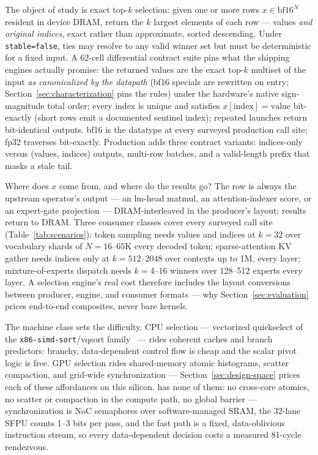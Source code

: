 The object of study is exact top-$k$ selection: given one or more rows
$x \in \mathrm{bf16}^{N}$ resident in device DRAM, return the $k$ largest
elements of each row --- values \emph{and original indices}, exact rather
than approximate, sorted descending. Under \texttt{stable=false}, ties may
resolve to any valid winner set but must be deterministic for a fixed
input. A 62-cell differential contract suite pins what the shipping
engines actually promise: the returned values are the exact top-$k$
multiset of the input \emph{as canonicalized by the datapath} (bf16
specials are rewritten on entry; Section~\ref{sec:characterization} pins
the rules) under the hardware's native sign-magnitude total order; every
index is unique and satisfies $x[\mathrm{index}] = \mathrm{value}$
bit-exactly (short rows emit a documented sentinel index); repeated
launches return bit-identical outputs. bf16 is
the datatype at every surveyed production call site; fp32 traverses
bit-exactly. Production adds three contract variants:
indices-only versus (values, indices) outputs, multi-row batches, and a
valid-length prefix that masks a stale tail.

Where does $x$ come from, and where do the results go? The row is
always the upstream operator's output --- an lm-head matmul, an
attention-indexer score, or an expert-gate projection ---
DRAM-interleaved in the producer's layout; results return to DRAM. Three
consumer classes cover every surveyed call site
(Table~\ref{tab:scenarios}): token sampling needs values and indices at
$k{=}32$ over vocabulary shards of $N{=}16$--$65$K every decoded token;
sparse-attention KV gather needs indices only at $k{=}512$--$2048$ over
contexts up to 1M, every layer; mixture-of-experts dispatch needs
$k{=}4$--$16$ winners over 128--512 experts every layer. A selection engine's real cost therefore includes the layout
conversions between producer, engine, and consumer formats --- why
Section~\ref{sec:evaluation} prices end-to-end composites, never bare
kernels.

The machine class sets the difficulty. CPU selection --- vectorized
quickselect of the \texttt{x86-simd-sort}/vqsort
family~\cite{intel_x86simdsort,blacher2023vqsort} --- rides coherent
caches and branch predictors: branchy, data-dependent control flow is
cheap and the scalar pivot logic is free. GPU selection rides
shared-memory atomic histograms, scatter compaction, and grid-wide
synchronization --- Section~\ref{sec:design-space} prices each of these
affordances on this silicon. \bh has none of them: no
cross-core atomics, no scatter or compaction in the compute path, no
global barrier --- synchronization is NoC semaphores over
software-managed SRAM, the 32-lane SFPU counts 1--3 bits per pass, and
the fast path is a fixed, data-oblivious instruction stream, so every
data-dependent decision costs a measured 81-cycle rendezvous.


